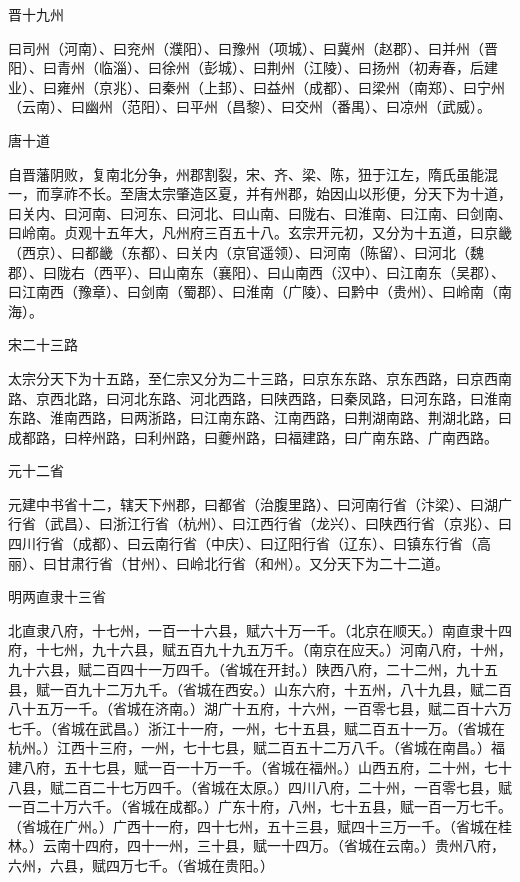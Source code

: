 \documentclass[a4paper,12pt,UTF8,twoside]{ctexbook}
\begin{document}
	晋十九州
	
	曰司州（河南）、曰兖州（濮阳）、曰豫州（项城）、曰冀州（赵郡）、曰并州（晋阳）、曰青州（临淄）、曰徐州（彭城）、曰荆州（江陵）、曰扬州（初寿春，后建业）、曰雍州（京兆）、曰秦州（上邽）、曰益州（成都）、曰梁州（南郑）、曰宁州（云南）、曰幽州（范阳）、曰平州（昌黎）、曰交州（番禺）、曰凉州（武威）。
	
	唐十道
	
	自晋藩阴败，复南北分争，州郡割裂，宋、齐、梁、陈，狃于江左，隋氏虽能混一，而享祚不长。至唐太宗肇造区夏，并有州郡，始因山以形便，分天下为十道，曰关内、曰河南、曰河东、曰河北、曰山南、曰陇右、曰淮南、曰江南、曰剑南、曰岭南。贞观十五年大，凡州府三百五十八。玄宗开元初，又分为十五道，曰京畿（西京）、曰都畿（东都）、曰关内（京官遥领）、曰河南（陈留）、曰河北（魏郡）、曰陇右（西平）、曰山南东（襄阳）、曰山南西（汉中）、曰江南东（吴郡）、曰江南西（豫章）、曰剑南（蜀郡）、曰淮南（广陵）、曰黔中（贵州）、曰岭南（南海）。
	
	宋二十三路
	
	太宗分天下为十五路，至仁宗又分为二十三路，曰京东东路、京东西路，曰京西南路、京西北路，曰河北东路、河北西路，曰陕西路，曰秦凤路，曰河东路，曰淮南东路、淮南西路，曰两浙路，曰江南东路、江南西路，曰荆湖南路、荆湖北路，曰成都路，曰梓州路，曰利州路，曰夔州路，曰福建路，曰广南东路、广南西路。
	
	元十二省
	
	元建中书省十二，辖天下州郡，曰都省（治腹里路）、曰河南行省（汴梁）、曰湖广行省（武昌）、曰浙江行省（杭州）、曰江西行省（龙兴）、曰陕西行省（京兆）、曰四川行省（成都）、曰云南行省（中庆）、曰辽阳行省（辽东）、曰镇东行省（高丽）、曰甘肃行省（甘州）、曰岭北行省（和州）。又分天下为二十二道。
	
	明两直隶十三省
	
	北直隶八府，十七州，一百一十六县，赋六十万一千。（北京在顺天。）南直隶十四府，十七州，九十六县，赋五百九十九五万千。（南京在应天。）河南八府，十州，九十六县，赋二百四十一万四千。（省城在开封。）陕西八府，二十二州，九十五县，赋一百九十二万九千。（省城在西安。）山东六府，十五州，八十九县，赋二百八十五万一千。（省城在济南。）湖广十五府，十六州，一百零七县，赋二百十六万七千。（省城在武昌。）浙江十一府，一州，七十五县，赋二百五十一万。（省城在杭州。）江西十三府，一州，七十七县，赋二百五十二万八千。（省城在南昌。）福建八府，五十七县，赋一百一十万一千。（省城在福州。）山西五府，二十州，七十八县，赋二百二十七万四千。（省城在太原。）四川八府，二十州，一百零七县，赋一百二十万六千。（省城在成都。）广东十府，八州，七十五县，赋一百一万七千。（省城在广州。）广西十一府，四十七州，五十三县，赋四十三万一千。（省城在桂林。）云南十四府，四十一州，三十县，赋一十四万。（省城在云南。）贵州八府，六州，六县，赋四万七千。（省城在贵阳。）
	
\end{document}
